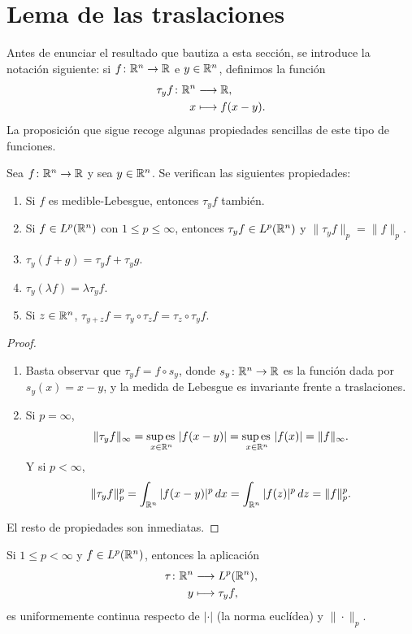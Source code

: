 \documentclass[a4paper, 11pt, oneside]{report}
\begin{document}
\section{Lema de las traslaciones}

Antes de enunciar el resultado que bautiza a esta sección, se introduce la notación siguiente: si $f \colon \mathbb R^n \to \mathbb R$ e $y \in \mathbb R^n$, definimos la función
\[\begin{aligned}[t]
  \tau_yf \colon \mathbb R^n &\longrightarrow \mathbb R, \\
  x &\longmapsto f(x-y).
\end{aligned}\]
La proposición que sigue recoge algunas propiedades sencillas de este tipo de funciones.

\begin{proposition}
  Sea $f \colon \mathbb R^n \to \mathbb R$ y sea $y \in \mathbb R^n$. Se verifican las siguientes propiedades:
  \begin{enumerate}
    \item Si $f$ es medible-Lebesgue, entonces $\tau_yf$ también.
    \item Si $f \in L^p(\mathbb R^n)$ con $1 \leq p \leq \infty$, entonces $\tau_yf \in L^p(\mathbb R^n)$ y $\|\tau_yf\|_p = \|f\|_p$.
    \item $\tau_y(f+g) = \tau_yf + \tau_yg$.
    \item $\tau_y(\lambda f) = \lambda \tau_y f$.
    \item Si $z \in \mathbb R^n$, $\tau_{y+z}f = \tau_y \circ \tau_zf = \tau_z \circ \tau_yf$.
  \end{enumerate}
\end{proposition}

\begin{proof}
  \hfill
  \begin{enumerate}
    \item Basta observar que $\tau_yf = f \circ s_y$, donde $s_y \colon \mathbb R^n \to \mathbb R$ es la función dada por $s_y(x)=x-y$, y la medida de Lebesgue es invariante frente a traslaciones.
    \item Si $p = \infty$,
    \[\|\tau_yf\|_\infty = \operatorname*{sup\,es\,}_{x \in \mathbb R^n} |f(x-y)| = \operatorname*{sup\,es\,}_{x \in \mathbb R^n} |f(x)| = \|f\|_{\infty}.\]
    Y si $p < \infty$,
    \[\|\tau_yf\|_p^p = \int_{\mathbb R^n}|f(x-y)|^p \, dx = \int_{\mathbb R^n} |f(z)|^p \, dz = \|f\|_p^p.\]
  \end{enumerate}
  El resto de propiedades son inmediatas.
\end{proof}

\begin{theorem}\label{teo:1.11.2}
  Si $1 \leq p < \infty$ y $f \in L^p(\mathbb R^n)$, entonces la aplicación
  \[\begin{aligned}[t]
  \tau \colon \mathbb R^n &\longrightarrow L^p(\mathbb R^n),\\
  y &\longmapsto \tau_yf,
  \end{aligned}\]
  es uniformemente continua respecto de $|\cdot|$ (la norma euclídea) y $\|\cdot\|_p$.
\end{theorem}
\end{document}
